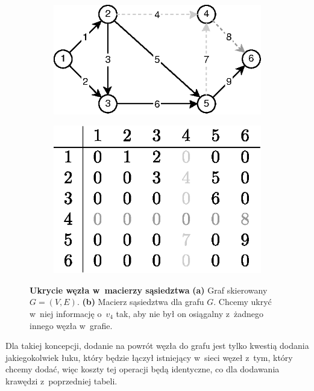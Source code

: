 \begin{figure}[!htbp]
	\centering
	\begin{subfigure}[b]{0.5\textwidth}
		\includegraphics[width=\textwidth]{Chapter_I/6/1_6a.eps}
		\caption{}
	\end{subfigure}%
	\qquad
	\begin{subfigure}[b]{0.4\textwidth}
		\includegraphics[width=\textwidth]{Chapter_I/6/1_6b.eps}
		\caption{}
	\end{subfigure}
	\caption{\textbf{Ukrycie węzła w~macierzy sąsiedztwa} \textbf{(a)} Graf skierowany $G = \left( V, E \right)$. \textbf{(b)} Macierz sąsiedztwa dla grafu $G$. Chcemy ukryć w~niej informację o~$v_{4}$ tak, aby nie był on osiągalny z~żadnego innego węzła w~grafie. }\label{fig:adjacencyMatrixHideNode}
\end{figure}

Dla takiej koncepcji, dodanie na powrót węzła do grafu jest tylko kwestią dodania jakiegokolwiek łuku, który będzie łączył istniejący w~sieci węzeł z~tym, który chcemy dodać, więc koszty tej operacji będą identyczne, co dla dodawania krawędzi z~poprzedniej tabeli.

